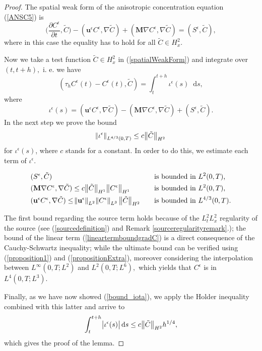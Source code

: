 \documentclass[11pt]{article}
\newcommand*\diff{\mathop{}\!\mathrm{d}}
\begin{document}
\begin{proof}
The spatial weak form of the anisotropic concentration equation (\ref{ANSC5}) is
%
\begin{equation}
\bigg (\frac{\partial C^\epsilon}{\partial t}, \tilde{C} \bigg ) - (\mathbf{u}^\epsilon C^\epsilon, \nabla \tilde{C}) + (\mathbf{M} \nabla C^\epsilon, \nabla \tilde{C}) = (S^\epsilon, \tilde{C}), \label{spatialWeakForm}
\end{equation}
%
where in this case the equality has to hold for all $\tilde{C} \in H^2_x.$

Now we take a test function $\tilde{C} \in H^2_x$ in (\ref{spatialWeakForm}) and integrate over $(t, t+h),$ i. e. we have
%
\[ (\tau_h C^\epsilon (t) - C^\epsilon (t), \tilde{C}) = \int_t^{t+h} \iota^\epsilon (s) \diff s,\]
%
where
%
\[ \iota^\epsilon (s) = (\mathbf{u}^\epsilon C^\epsilon, \nabla \tilde{C}) - (\mathbf{M} \nabla C^\epsilon, \nabla \tilde{C}) + (S^\epsilon, \tilde{C}). \]
%
In the next step we prove the bound
\begin{equation} \norm{\iota^\epsilon}_{L^{4/3}(0,T)} \leq c \big \| \tilde{C} \big \| _{H^2} \label{bound_iota} \end{equation}
%
for $\iota^\epsilon(s)$, where $c$ stands for a constant. In order to do this, we estimate each term of $\iota^\epsilon.$

\begin{align} 
& (S^\epsilon, \tilde{C}) &\quad & \text{is bounded in $L^2(0,T)$,} \\ 
& \label{lineartermboundgradC} (\mathbf{M} \nabla C^\epsilon, \nabla \tilde{C}) \leq c \big \| \tilde{C} \big \| _{H^1} \big \| C^\epsilon \big \| _{H^1} &\quad & \text{is bounded in $L^2(0,T)$,} \\
& (\mathbf{u}^\epsilon C^\epsilon, \nabla \tilde{C}) \leq \norm{\mathbf{u}^\epsilon}_{L^2} \norm{C^\epsilon}_{L^3} \big \| \tilde{C} \big \| _{H^2} &\quad & \text{is bounded in $L^{4/3}(0,T).$}
\end{align} 

The first bound regarding the source term holds because of the $L^2_t L^2_x$ regularity of the source (see (\ref{sourcedefinition}) and Remark \ref{sourceregularityremark}.); the bound of the linear term (\ref{lineartermboundgradC}) is a direct consequence of the Cauchy-Schwartz inequality; while the ultimate bound can be verified using (\ref{proposition1}) and (\ref{propositionExtra}), moreover considering the interpolation between $L^\infty(0,T; L^2)$ and $L^2(0,T; L^6),$ which yields that $C^\epsilon$ is in $L^4(0,T; L^3)$.

Finally, as we have now showed (\ref{bound_iota}), we apply the Holder inequality combined with this latter and arrive to
%
\[ \int_t^{t+h} \abs{\iota^\epsilon (s)} \diff s \leq c \big \| \tilde{C} \big \| _{H^2} h^{1/4},\]
%
which gives the proof of the lemma.
\end{proof}
\end{document}

